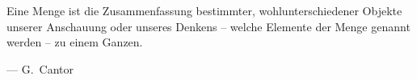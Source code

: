 {
	\setlength{}
	\setlength\epigraphrule{0pt}



\epigraph{Eine Menge ist die Zusammenfassung bestimmter, wohlunterschiedener Objekte unserer Anschauung oder unseres Denkens -- welche Elemente der Menge genannt werden – zu einem Ganzen.\footnotemark}{--- G.~Cantor}

}